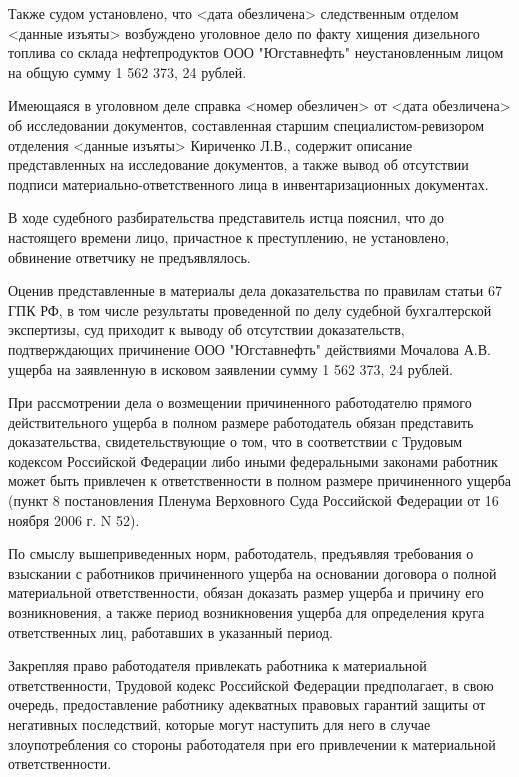 \documentclass[a4paper]{article}
\begin{document}
		Также судом установлено, что <дата обезличена> следственным отделом <данные изъяты> возбуждено уголовное дело по факту хищения дизельного топлива со склада нефтепродуктов ООО "Югставнефть" неустановленным лицом на общую сумму 1 562 373, 24 рублей.
		
		Имеющаяся в уголовном деле справка <номер обезличен> от <дата обезличена> об исследовании документов, составленная старшим специалистом-ревизором отделения <данные изъяты> Кириченко Л.В., содержит описание представленных на исследование документов, а также вывод об отсутствии подписи материально-ответственного лица в инвентаризационных документах.
		
		В ходе судебного разбирательства представитель истца пояснил, что до настоящего времени лицо, причастное к преступлению, не установлено, обвинение ответчику не предъявлялось.
		
		Оценив представленные в материалы дела доказательства по правилам статьи 67 ГПК РФ, в том числе результаты проведенной по делу судебной бухгалтерской экспертизы, суд приходит к выводу об отсутствии доказательств, подтверждающих причинение ООО "Югставнефть" действиями Мочалова А.В. ущерба на заявленную в исковом заявлении сумму 1 562 373, 24 рублей.
		
		При рассмотрении дела о возмещении причиненного работодателю прямого действительного ущерба в полном размере работодатель обязан представить доказательства, свидетельствующие о том, что в соответствии с Трудовым кодексом Российской Федерации либо иными федеральными законами работник может быть привлечен к ответственности в полном размере причиненного ущерба (пункт 8 постановления Пленума Верховного Суда Российской Федерации от 16 ноября 2006 г. N 52).
		
		По смыслу вышеприведенных норм, работодатель, предъявляя требования о взыскании с работников причиненного ущерба на основании договора о полной материальной ответственности, обязан доказать размер ущерба и причину его возникновения, а также период возникновения ущерба для определения круга ответственных лиц, работавших в указанный период.
		
		Закрепляя право работодателя привлекать работника к материальной ответственности, Трудовой кодекс Российской Федерации предполагает, в свою очередь, предоставление работнику адекватных правовых гарантий защиты от негативных последствий, которые могут наступить для него в случае злоупотребления со стороны работодателя при его привлечении к материальной ответственности.
		
\end{document}
